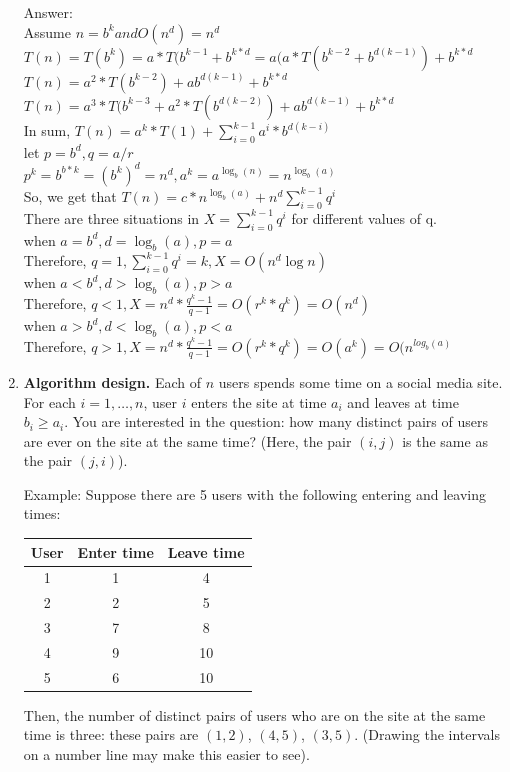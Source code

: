 \documentclass[12pt]{article}
\begin{document}
\begin{enumerate}
  {\color{blue}Answer: 
  \\ Assume $n = b^k and O(n^d) = n^d$
  \\$T(n) = T(b^k) = a*T(b^{k-1} + b^{k*d}=a(a*T(b^{k-2}+b^{d(k-1)}) +b^{k*d} $
  \\$T(n) = a^2* T(b^{k-2}) +ab^{d(k-1)}+b^{k*d}$
  \\$T(n) =a^3*T(b^{k-3}+a^2* T(b^{d(k-2)}) +ab^{d(k-1)}+b^{k*d}$
  \\In sum, $T(n)= a^k*T(1) + {\sum_{i=0}^{k-1}a^i*b^{d(k-i)} }$
  \\let $ p = b^d, q= a/r$
  \\$p^k = b^{b*k}=(b^k)^d =n^d, a^k =a^{\log_b(n)}= n^{\log_b(a)}$
  \\So, we get that $T(n) = c*n^{\log_b(a)}+ n^d {\sum_{i=0}^{k-1}q^i}$
  \\There are three situations in $X = {\sum_{i=0}^{k-1}q^i}$ for different values of q.
  \\when $a= b^d, d=\log_b(a), p =a $
  \\Therefore, $q = 1, {\sum_{i=0}^{k-1}q^i}=k, X = O(n^d \log n)$
  \\when  $a < b^d, d > \log_b(a), p > a $
  \\Therefore, $q<1, X = n^d*\frac{q^k-1}{q-1} = O (r^k*q^k) = O(n^d)$
  \\when $a > b^d, d < \log_b(a), p < a $
  \\Therefore, $q >1, X = n^d*\frac{q^k-1}{q-1} = O (r^k*q^k) = O(a^k) = O(n^{log_b(a)}$
  }
  
  
  \item \textbf{Algorithm design.} Each of $n$ users spends some time on a social media site.  For each $i = 1,\ldots, n$, user $i$ enters the site at time $a_i$ and leaves at time $b_i \geq a_i$.  You are interested in the question: how many distinct pairs of users are ever on the site at the same time?  (Here, the pair $(i,j)$ is the same as the pair $(j,i)$).

  Example: Suppose there are 5 users with the following entering and leaving times:
  \begin{center}
    \begin{tabular}{c|c|c}
      User & Enter time & Leave time \\
      \hline
      1 & 1 & 4 \\
      2 & 2 & 5 \\
      3 & 7 & 8 \\
      4 & 9 & 10 \\
      5 & 6 & 10
    \end{tabular}
  \end{center}
  Then, the number of distinct pairs of users who are on the site at the same time is three: these pairs are $(1, 2)$, $(4,5)$, $(3,5)$. (Drawing the intervals on a number line may make this easier to see).


\end{enumerate}
\end{document}
